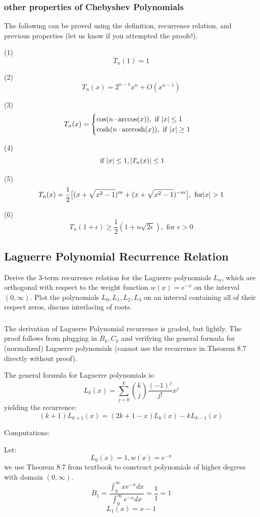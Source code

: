 \documentclass[12pt]{article} %
\newcommand{\1}[1]{\mathds{1}\left[#1\right]}
\newcommand{\eps}{\epsilon}
\DeclareMathOperator{\arccosh}{arccosh}
\begin{document}
\subsubsection{other properties of Chebyshev Polynomials}
The following can be proved using the definition, recurrence relation, and previous properties (let us know if you attempted the proofs!).

(1)
$$
	T_n(1) = 1
$$

(2)
$$
	T_n(x) = 2^{n-1}x^n + O(x^{n-1})
$$

(3)
$$
	T_n(x) = 
	\begin{cases}
		\cos(n\cdot \arccos(x)), \text{ if }\abs{x}\le 1\\
		\cosh(n\cdot \arccosh(x)), \text{ if }\abs{x}\ge 1
	\end{cases}
$$

(4)
$$
	\text{ if }\abs{x}\le 1, \abs{T_n(x)}\le 1
$$

(5)
$$
	T_n(x) = \frac12 \big[
	(x+\sqrt{x^2-1})^m + (x + \sqrt{x^2 - 1})^{-m}
	\big], \text{ for}\abs{x}> 1
$$

(6)
$$
	T_n(1+\eps) \ge \frac12(1+n\sqrt{2\eps}),\text{ for }\eps>0
$$


\newpage
\subsection{Laguerre Polynomial Recurrence Relation}
Derive the 3-term recurrence relation for the Laguerre polynomials $L_n$, which are orthogonal with respect to the weight function $w(x) = e^{-x}$ on the interval $(0,\infty)$. Plot the polynomials $L_0, L_1,L_2,L_3$ on an interval containing all of their respect zeros, discuss interlacing of roots. 
\subsubsection{}
The derivation of Laguerre Polynomial recurrence is graded, but lightly. The proof follows from plugging in $B_k, C_k$ and verifying the general formula for (normalized) Laguerre polynomials (cannot use the recurrence in Theorem 8.7 directly without proof).

The general formula for Laguerre polynomials is:
$$
	L_k(x) = \sum_{j=0}^{k}{k\choose j}\frac{(-1)^j}{j!}x^j
$$ yielding the recurrence:
$$
	(k+1)L_{k+1}(x) = (2k+1-x)L_{k}(x) - kL_{k-1}(x)
$$

Computations:

Let:
$$
	L_0(x) = 1, w(x) = e^{-x}
$$ we use Theorem 8.7 from textbook to construct polynomials of higher degrees with domain $(0,\infty)$. 
$$
	B_1 = \frac{\int_0^{\infty} xe^{-x}dx}{\int_0^{\infty} e^{-x}dx} = \frac{1}{1}= 1
$$
$$
	L_1(x) = x-1
$$
\end{document}
